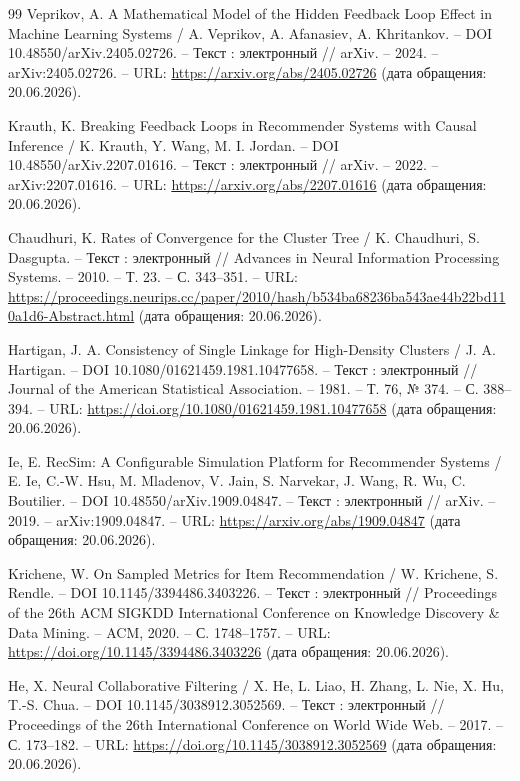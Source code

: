 \begin{thebibliography}{99}
Veprikov, A. A Mathematical Model of the Hidden Feedback Loop Effect in Machine Learning Systems / A. Veprikov, A. Afanasiev, A. Khritankov. -- DOI 10.48550/arXiv.2405.02726. -- Текст : электронный // arXiv. -- 2024. -- arXiv:2405.02726. -- URL: \url{https://arxiv.org/abs/2405.02726} (дата обращения: 20.06.2026).

Krauth, K. Breaking Feedback Loops in Recommender Systems with Causal Inference / K. Krauth, Y. Wang, M. I. Jordan. -- DOI 10.48550/arXiv.2207.01616. -- Текст : электронный // arXiv. -- 2022. -- arXiv:2207.01616. -- URL: \url{https://arxiv.org/abs/2207.01616} (дата обращения: 20.06.2026).

Chaudhuri, K. Rates of Convergence for the Cluster Tree / K. Chaudhuri, S. Dasgupta. -- Текст : электронный // Advances in Neural Information Processing Systems. -- 2010. -- Т. 23. -- С. 343--351. -- URL: \url{https://proceedings.neurips.cc/paper/2010/hash/b534ba68236ba543ae44b22bd110a1d6-Abstract.html} (дата обращения: 20.06.2026).

Hartigan, J. A. Consistency of Single Linkage for High-Density Clusters / J. A. Hartigan. -- DOI 10.1080/01621459.1981.10477658. -- Текст : электронный // Journal of the American Statistical Association. -- 1981. -- Т. 76, № 374. -- С. 388--394. -- URL: \url{https://doi.org/10.1080/01621459.1981.10477658} (дата обращения: 20.06.2026).

Ie, E. RecSim: A Configurable Simulation Platform for Recommender Systems / E. Ie, C.-W. Hsu, M. Mladenov, V. Jain, S. Narvekar, J. Wang, R. Wu, C. Boutilier. -- DOI 10.48550/arXiv.1909.04847. -- Текст : электронный // arXiv. -- 2019. -- arXiv:1909.04847. -- URL: \url{https://arxiv.org/abs/1909.04847} (дата обращения: 20.06.2026).

Krichene, W. On Sampled Metrics for Item Recommendation / W. Krichene, S. Rendle. -- DOI 10.1145/3394486.3403226. -- Текст : электронный // Proceedings of the 26th ACM SIGKDD International Conference on Knowledge Discovery \& Data Mining. -- ACM, 2020. -- С. 1748--1757. -- URL: \url{https://doi.org/10.1145/3394486.3403226} (дата обращения: 20.06.2026).

He, X. Neural Collaborative Filtering / X. He, L. Liao, H. Zhang, L. Nie, X. Hu, T.-S. Chua. -- DOI 10.1145/3038912.3052569. -- Текст : электронный // Proceedings of the 26th International Conference on World Wide Web. -- 2017. -- С. 173--182. -- URL: \url{https://doi.org/10.1145/3038912.3052569} (дата обращения: 20.06.2026).


\end{thebibliography}
